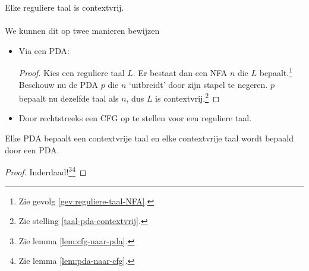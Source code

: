 \documentclass[main.tex]{subfiles}
\begin{document}
\begin{gev}
  Elke reguliere taal is contextvrij.\\\\
  We kunnen dit op twee manieren bewijzen
  \begin{itemize}
  \item Via een PDA:
    \begin{proof}
      Kies een reguliere taal $L$. Er bestaat dan een NFA $n$ die $L$ bepaalt.\footnote{Zie gevolg \ref{gev:reguliere-taal-NFA}.}
      Beschouw nu de PDA $p$ die $n$ `uitbreidt' door zijn stapel te negeren.
      $p$ bepaalt nu dezelfde taal als $n$, dus $L$ is contextvrij.\footnote{Zie stelling \ref{taal-pda-contextvrij}.}
    \end{proof}
  \item Door rechtstreeks een CFG op te stellen voor een reguliere taal.
  \end{itemize}
\end{gev}

\begin{st}
  Elke PDA bepaalt een contextvrije taal en elke contextvrije taal wordt bepaald door een PDA.
 
  \begin{proof}
    Inderdaad!\footnote{Zie lemma \ref{lem:cfg-naar-pda}.}\footnote{Zie lemma \ref{lem:pda-naar-cfg}.}
  \end{proof}
\end{st}
\end{document}
